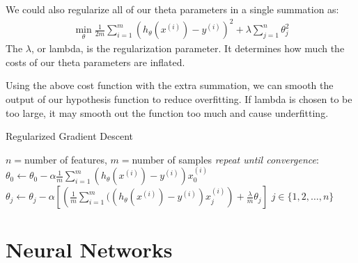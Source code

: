 \documentclass{article}
\begin{document}
            We could also regularize all of our theta parameters in a single summation as:
            \begin{align*}
                \min_{\theta}\frac{1}{2m}\sum_{i=1}^m(h_{\theta}(x^{(i)})-y^{(i)})^2 + \lambda\sum_{j=1}^{n}\theta_j^2        
            \end{align*}
            The $\lambda$, or lambda, is the regularization parameter. It determines how much the costs of our theta parameters are inflated.

            Using the above cost function with the extra summation, we can smooth the output of our hypothesis function to reduce overfitting. If lambda is chosen 
            to be too large, it may smooth out the function too much and cause underfitting.

            \begin{algorithm}
                \caption{Regularized Gradient Descent}
                \begin{algorithmic}
                    \STATE $n = $number of features, $m = $number of samples
                    \STATE \emph{repeat until convergence}:
                    \STATE \hspace{12pt}$\theta_0 \gets \theta_0 - \alpha\frac{1}{m}\sum_{i=1}^{m}(h_{\theta}(x^{(i)})-y^{(i)})x_0^{(i)}$
                    \STATE \hspace{12pt}$\theta_j \gets \theta_j - \alpha\left[\left(\frac{1}{m}\sum_{i=1}^{m}((h_{\theta}(x^{(i)})-y^{(i)})x_j^{(i)}\right) + \frac{\lambda}{m}\theta_j\right]$ \qquad $j \in \{1,2,\ldots,n\}$
                \end{algorithmic}
            \end{algorithm}    

    \section{Neural Networks}
\end{document}
